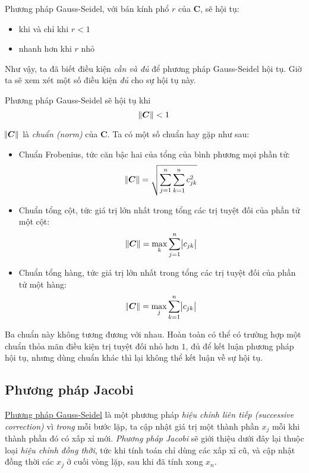 \documentclass[../../Lectures]{subfiles}
\begin{document}
Phương pháp Gauss-Seidel, với bán kính phổ \(r\) của \(\bm{C}\), sẽ hội tụ:
\begin{itemize}
    \item khi và chỉ khi \(r < 1\)
    \item nhanh hơn khi \(r\) nhỏ
\end{itemize}

Như vậy, ta đã biết điều kiện \emph{cần và đủ} để phương pháp Gauss-Seidel hội
tụ. Giờ ta sẽ xem xét một số điều kiện \emph{đủ} cho sự hội tụ này.

Phương pháp Gauss-Seidel sẽ hội tụ khi
\[\norm{\bm{C}} < 1\]

\(\norm{\bm{C}}\) là \emph{chuẩn (norm)} của \(\bm{C}\). Ta có một số chuẩn hay
gặp như sau:
\begin{itemize}
    \item Chuẩn Frobenius, tức căn bậc hai của tổng của bình phương mọi phần tử:
        \[\norm{\bm{C}} = \sqrt{\sum_{j = 1}^n \sum_{k = 1}^n c_{jk}^2}\]

    \item Chuẩn tổng cột, tức giá trị lớn nhất trong tổng các trị tuyệt đối của
        phần tử một cột:
        \[\norm{\bm{C}} = \max_k \sum_{j = 1}^n \abs{c_{jk}}\]

    \item Chuẩn tổng hàng, tức giá trị lớn nhất trong tổng các trị tuyệt đối của
        phần tử một hàng:
        \[\norm{\bm{C}} = \max_j \sum_{k = 1}^n \abs{c_{jk}}\]
\end{itemize}

Ba chuẩn này không tương đương với nhau. Hoàn toàn có thể có trường hợp một
chuẩn thỏa mãn điều kiện trị tuyệt đối nhỏ hơn \(1\), đủ để kết luận phương pháp
hội tụ, nhưng dùng chuẩn khác thì lại không thể kết luận về sự hội tụ.

\subsection{Phương pháp Jacobi}

\hyperref[method:gauss-seidel]{Phương pháp Gauss-Seidel} là một phương pháp
\emph{hiệu chỉnh liên tiếp (successive correction)} vì \emph{trong} mỗi bước
lặp, ta cập nhật giá trị một thành phần \(x_j\) mỗi khi thành phần đó có xấp xỉ
mới. \emph{Phương pháp Jacobi} sẽ giới thiệu dưới đây lại thuộc loại \emph{hiệu
chỉnh đồng thời}, tức khi tính toán chỉ dùng các xấp xỉ cũ, và cập nhật đồng
thời các \(x_j\) ở cuối vòng lặp, sau khi đã tính xong \(x_n\).
\end{document}
